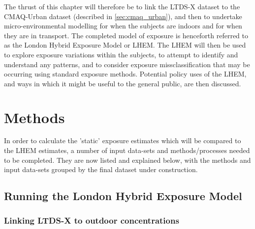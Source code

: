 The thrust of this chapter will therefore be to link the LTDS-X dataset to the CMAQ-Urban dataset (described in \ref{sec:cmaq_urban}), and then to undertake micro-environmental modelling for when the subjects are indoors and for when they are in transport. The completed model of exposure is henceforth referred to as the London Hybrid Exposure Model or LHEM. The LHEM will then be used to explore exposure variations within the subjects, to attempt to identify and understand any patterns, and to consider exposure missclassification that may be occurring using standard exposure methods. Potential policy uses of the LHEM, and ways in which it might be useful to the general public, are then discussed.

\section{Methods}
\label{sec:2methods}

In order to calculate the 'static' exposure estimates which will be compared to the LHEM estimates, a number of input data-sets and methods/processes needed to be completed. They are now listed and explained below, with the methods and input data-sets grouped by the final dataset under construction.

    \subsection{Running the London Hybrid Exposure Model}
    \label{sec:running_the_lhem}

        \subsubsection{Linking LTDS-X to outdoor concentrations}
        \label{sec:linking_ltdsx_to_cmaq}

